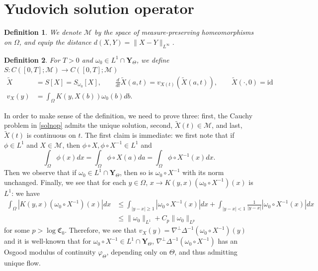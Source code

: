 \documentclass[12pt]{article}
\newtheorem{definition}{Definition}
\begin{document}
\section{Yudovich solution operator}

\begin{definition}
We denote $\mathcal{M}$ by the space of measure-preserving homeomorphisms on $\Omega$, and equip the distance $d(X, Y) = \| X - Y \|_{L^\infty}$.
\end{definition}

\begin{definition}
For $T>0$ and $\omega_0 \in L^1 \cap \mathbf{Y}_{\Theta} $, we define $S: C([0, T]; \mathcal{M}) \rightarrow C([0, T] ; \mathcal{M} ) $
\begin{equation} \label{solnop}
\begin{split}
\tilde{X} &= S[X] = S_{\omega_0} [X], \qquad \frac{d}{dt} \tilde{X} (a,t) = v_{X(t)} (\tilde{X}(a,t)), \qquad \tilde{X} (\cdot, 0) =  \mathrm{id}  \\
v_X (y) &= \int_{\Omega} K(y, X(b) ) \omega_0 (b) db.
\end{split}
\end{equation}
\end{definition}
In order to make sense of the definition, we need to prove three: first, the Cauchy problem in \eqref{solnop} admits the unique solution, second, $\tilde{X}(t) \in \mathcal{M}$, and last, $\tilde{X}(t)$ is continuous on $t$. The first claim is immediate: we first note that if $\phi \in L^1$ and $X \in \mathcal{M}$, then $\phi \circ X, \phi \circ X^{-1} \in L^1$ and  
\begin{equation*}
\int_{\Omega} \phi (x) dx = \int_{\Omega} \phi \circ X(a) da = \int_{\Omega} \phi \circ X^{-1} (x) dx.
\end{equation*}
Then we observe that if $\omega_0 \in L^1 \cap \mathbf{Y}_{\Theta}$, then so is $\omega_0 \circ X^{-1}$ with its norm unchanged. Finally, we see that for each $y \in \Omega $, $x \rightarrow K(y, x) (\omega_0 \circ X^{-1}) (x) $ is $L^1$: we have 
\begin{equation*}
\begin{split}
\int_{\Omega} \left | K(y,x) (\omega_0 \circ X^{-1}) (x) \right |dx &\le \int_{|y-x| \ge 1 }   | \omega_0 \circ X^{-1} (x) | dx  + \int_{|y-x| <1}  \frac{1}{|y-x|} | \omega_0 \circ X^{-1} (x) | dx \\
&\le \| \omega_0 \|_{L^1} + C_p \| \omega_0  \|_{L^p}
\end{split}
\end{equation*}
for some $p>\log \mathfrak{C}_0$. Therefore, we see that $v_X (y) = \nabla^\perp \Delta^{-1} (\omega_0 \circ X^{-1} ) (y)$ and it is well-known that for $\omega_0 \circ X^{-1} \in L^1 \cap \mathbf{Y}_{\Theta}$, $\nabla^\perp \Delta^{-1} (\omega_0 \circ X^{-1} ) $ has an Osgood modulus of continuity $\varphi_{\Theta}$, depending only on $\Theta$, and thus admitting unique flow. 
\end{document}
